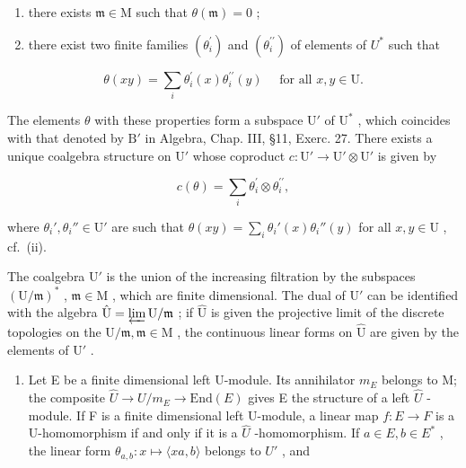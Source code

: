 \begin{enumerate}
\def\labelenumi{(\roman{enumi})}
\item
  there exists \(\mathfrak{m} \in \mathrm{M}\) such that \(\theta(\mathfrak{m}) = 0\) ;
\item
  there exist two finite families \((\theta_{i}^{\prime})\) and \((\theta_{i}^{\prime\prime})\) of elements of \(U^{*}\) such that
\end{enumerate}

\[
\theta (x y) = \sum_ {i} \theta_ {i} ^ {\prime} (x) \theta_ {i} ^ {\prime \prime} (y) \quad \text { for   all } x, y \in \mathrm{U}.
\]

The elements \(\theta\) with these properties form a subspace \(\mathrm{U}'\) of \(\mathrm{U}^*\) , which coincides with that denoted by \(\mathrm{B}'\) in Algebra, Chap. III, §11, Exerc. 27. There exists a unique coalgebra structure on \(\mathrm{U}'\) whose coproduct \(c: \mathrm{U}' \to \mathrm{U}' \otimes \mathrm{U}'\) is given by

\[
c (\theta) = \sum_ {i} \theta_ {i} ^ {\prime} \otimes \theta_ {i} ^ {\prime \prime},
\]

where \(\theta_i', \theta_i'' \in \mathrm{U}'\) are such that \(\theta(xy) = \sum_{i} \theta_i'(x) \theta_i''(y)\) for all \(x, y \in \mathrm{U}\) , cf.~(ii).

The coalgebra \(\mathrm{U}'\) is the union of the increasing filtration by the subspaces \((\mathrm{U} / \mathfrak{m})^*\) , \(\mathfrak{m} \in \mathrm{M}\) , which are finite dimensional. The dual of \(\mathrm{U}'\) can be identified with the algebra \(\hat{\mathrm{U}} = \varprojlim \mathrm{U} / \mathfrak{m}\) ; if \(\hat{\mathrm{U}}\) is given the projective limit of the discrete topologies on the \(\mathrm{U} / \mathfrak{m}, \mathfrak{m} \in \mathrm{M}\) , the continuous linear forms on \(\hat{\mathrm{U}}\) are given by the elements of \(\mathrm{U}'\) .


\begin{enumerate}
\def\labelenumi{\alph{enumi})}
\setcounter{enumi}{1}
\tightlist
\item
  Let E be a finite dimensional left U-module. Its annihilator \(m_{E}\) belongs to M; the composite \(\hat{U} \to U/m_{E} \to \text{End}(E)\) gives E the structure of a left \(\hat{U}\) -module. If F is a finite dimensional left U-module, a linear map \(f : E \to F\) is a U-homomorphism if and only if it is a \(\hat{U}\) -homomorphism. If \(a \in E, b \in E^{*}\) , the linear form \(\theta_{a,b} : x \mapsto \langle xa, b \rangle\) belongs to \(U'\) , and
\end{enumerate}

